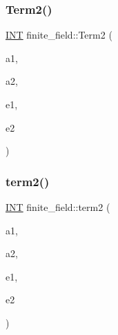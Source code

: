 \mbox{\label{classfinite__field_afe789cbea26c8b3f3b0cb3a47f1ee5db}} 
\subsubsection{\texorpdfstring{Term2()}{Term2()}}
{\footnotesize\ttfamily \mbox{\hyperlink{galois_8h_a09fddde158a3a20bd2dcadb609de11dc}{I\+NT}} finite\+\_\+field\+::\+Term2 (\begin{DoxyParamCaption}\item[{\mbox{\hyperlink{galois_8h_a09fddde158a3a20bd2dcadb609de11dc}{I\+NT}}}]{a1,  }\item[{\mbox{\hyperlink{galois_8h_a09fddde158a3a20bd2dcadb609de11dc}{I\+NT}}}]{a2,  }\item[{\mbox{\hyperlink{galois_8h_a09fddde158a3a20bd2dcadb609de11dc}{I\+NT}}}]{e1,  }\item[{\mbox{\hyperlink{galois_8h_a09fddde158a3a20bd2dcadb609de11dc}{I\+NT}}}]{e2 }\end{DoxyParamCaption})}

\mbox{\label{classfinite__field_a2c1e3a9c6f76afaeffb73221f0a1d1df}} 
\subsubsection{\texorpdfstring{term2()}{term2()}}
{\footnotesize\ttfamily \mbox{\hyperlink{galois_8h_a09fddde158a3a20bd2dcadb609de11dc}{I\+NT}} finite\+\_\+field\+::term2 (\begin{DoxyParamCaption}\item[{\mbox{\hyperlink{galois_8h_a09fddde158a3a20bd2dcadb609de11dc}{I\+NT}}}]{a1,  }\item[{\mbox{\hyperlink{galois_8h_a09fddde158a3a20bd2dcadb609de11dc}{I\+NT}}}]{a2,  }\item[{\mbox{\hyperlink{galois_8h_a09fddde158a3a20bd2dcadb609de11dc}{I\+NT}}}]{e1,  }\item[{\mbox{\hyperlink{galois_8h_a09fddde158a3a20bd2dcadb609de11dc}{I\+NT}}}]{e2 }\end{DoxyParamCaption})}

\mbox{\label{classfinite__field_a4388515dca65e002d243cf69fbea17ae}} 
